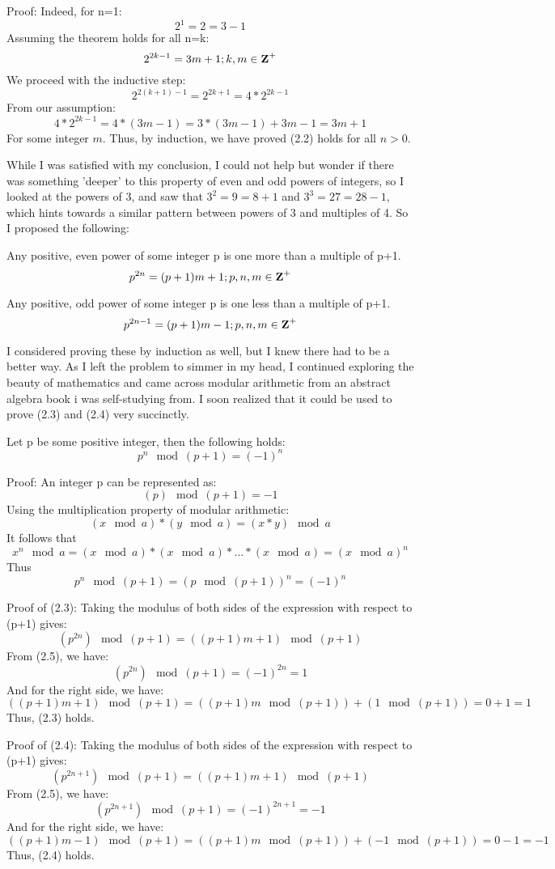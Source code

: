 Proof: Indeed, for n=1:
$$2^1=2=3-1$$
Assuming the theorem holds for all n=k:
$$2^{2k-1}=3m+1;k,m\in\mbox{\textbf{Z}}^+$$
We proceed with the inductive step:
$$2^{2(k+1)-1}=2^{2k+1}=4*2^{2k-1}$$
From our assumption:
$$4*2^{2k-1}=4*(3m-1)=3*(3m-1)+3m-1=3m+1$$
For some integer $m$. Thus, by induction, we have proved (2.2) holds for all $n>0$.

While I was satisfied with my conclusion, I could not help but wonder if there was something 'deeper' to this property of even and odd powers of integers, so I looked at the powers of 3, and saw that $3^2=9=8+1$ and $3^3=27=28-1$, which hints towards a similar pattern between powers of 3 and multiples of 4. So I proposed the following:

\begin{theorem}
    Any positive, even power of some integer \mbox{p} is one more than a multiple of \mbox{p+1}. 
    $$p^{2n}=(p+1)m+1;p,n,m\in\mbox{\textbf{Z}}^+$$
\end{theorem}

\begin{theorem}
    Any positive, odd power of some integer \mbox{p} is one less than a multiple of \mbox{p+1}. 
    $$p^{2n-1}=(p+1)m-1;p,n,m\in\mbox{\textbf{Z}}^+$$
\end{theorem}

I considered proving these by induction as well, but I knew there had to be a better way. As I left the problem to simmer in my head, I continued exploring the beauty of mathematics and came across modular arithmetic from an abstract algebra book i was self-studying from. I soon realized that it could be used to prove (2.3) and (2.4) very succinctly.
\begin{theorem}
    Let \mbox{p} be some positive integer, then the following holds:
    $$p^n\mod{(p+1)}=(-1)^n$$
\end{theorem}
Proof: An integer p can be represented as:
$$(p)\mod{(p+1)}=-1$$
Using the multiplication property of modular arithmetic:
$$(x\mod{a})*(y\mod{a})=(x*y)\mod{a}$$
It follows that 
$$x^n\mod{a}=(x\mod{a})*(x\mod{a})*\dots*(x\mod{a})=(x\mod{a})^n$$
Thus 
$$p^n\mod{(p+1)}=(p\mod{(p+1)})^n=(-1)^n$$

Proof of (2.3): Taking the modulus of both sides of the expression with respect to (p+1) gives:
$$(p^{2n})\mod{(p+1)}=((p+1)m+1)\mod{(p+1)}$$
From (2.5), we have:
$$(p^{2n})\mod{(p+1)}=(-1)^{2n}=1$$
And for the right side, we have:
$$((p+1)m+1)\mod{(p+1)}=((p+1)m\mod{(p+1)})+(1\mod{(p+1)})=0+1=1$$
Thus, (2.3) holds.

Proof of (2.4): Taking the modulus of both sides of the expression with respect to (p+1) gives:
$$(p^{2n+1})\mod{(p+1)}=((p+1)m+1)\mod{(p+1)}$$
From (2.5), we have:
$$(p^{2n+1})\mod{(p+1)}=(-1)^{2n+1}=-1$$
And for the right side, we have:
$$((p+1)m-1)\mod{(p+1)}=((p+1)m\mod{(p+1)})+(-1\mod{(p+1)})=0-1=-1$$
Thus, (2.4) holds.